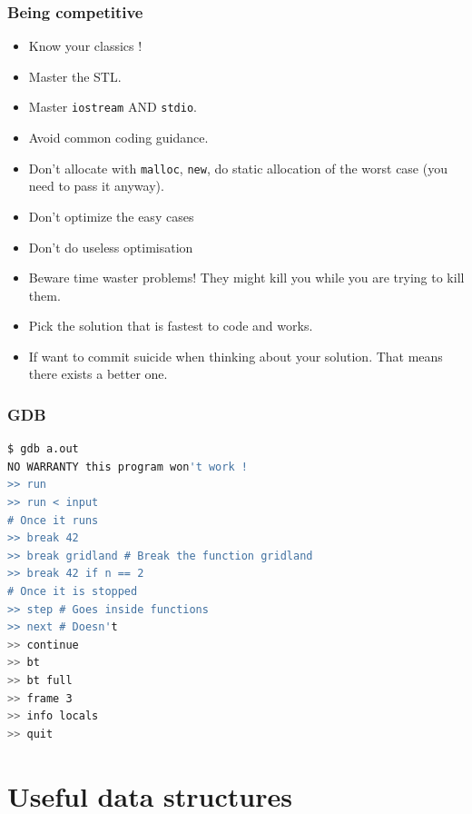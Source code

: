 \documentclass[10pt,svgnames,usenames,table]{beamer} %
\begin{document}
\begin{frame}
  \frametitle{Being competitive}
  \begin{itemize}
    \item Know your classics !
    \item Master the STL.
    \item Master \lstinline|iostream| AND \lstinline|stdio|.
    \item Avoid common coding guidance.
    \item Don't allocate with \lstinline|malloc|, \lstinline|new|,
      do static allocation of the worst case (you need to pass it anyway).
    \item Don't optimize the easy cases
    \item Don't do useless optimisation
    \item Beware time waster problems! They might kill you while you are trying to kill them.
    \item Pick the solution that is fastest to code and works.
    \item If want to commit suicide when thinking about your solution.
      That means there exists a better one.
  \end{itemize}
\end{frame}

\begin{frame}[fragile]
  \frametitle{GDB}
  \begin{lstlisting}[language=sh]
$ gdb a.out
NO WARRANTY this program won't work !
>> run
>> run < input
# Once it runs
>> break 42
>> break gridland # Break the function gridland
>> break 42 if n == 2
# Once it is stopped
>> step # Goes inside functions
>> next # Doesn't
>> continue
>> bt
>> bt full
>> frame 3
>> info locals
>> quit
  \end{lstlisting}
\end{frame}

\section{Useful data structures}
\end{document}
